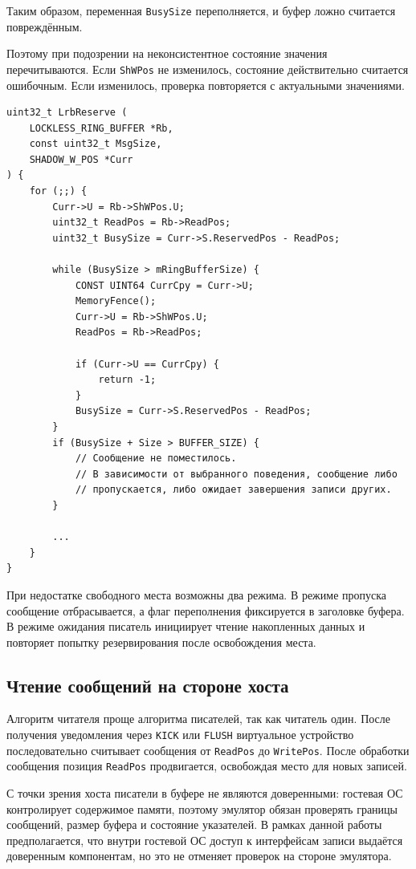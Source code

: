 Таким образом, переменная \texttt{BusySize} переполняется, и буфер ложно
считается повреждённым.

Поэтому при подозрении на неконсистентное состояние значения перечитываются.
Если \texttt{ShWPos} не изменилось, состояние действительно считается ошибочным.
Если изменилось, проверка повторяется с актуальными значениями.

\begin{lstlisting}
uint32_t LrbReserve (
    LOCKLESS_RING_BUFFER *Rb,
    const uint32_t MsgSize,
    SHADOW_W_POS *Curr
) {
    for (;;) {
        Curr->U = Rb->ShWPos.U;
        uint32_t ReadPos = Rb->ReadPos;
        uint32_t BusySize = Curr->S.ReservedPos - ReadPos;

        while (BusySize > mRingBufferSize) {
            CONST UINT64 CurrCpy = Curr->U;
            MemoryFence();
            Curr->U = Rb->ShWPos.U;
            ReadPos = Rb->ReadPos;

            if (Curr->U == CurrCpy) {
                return -1;
            }            
            BusySize = Curr->S.ReservedPos - ReadPos;
        }
        if (BusySize + Size > BUFFER_SIZE) {
            // Сообщение не поместилось.
            // В зависимости от выбранного поведения, сообщение либо
            // пропускается, либо ожидает завершения записи других.
        }

        ...
    }
}
\end{lstlisting}

При недостатке свободного места возможны два режима. В режиме пропуска сообщение
отбрасывается, а флаг переполнения фиксируется в заголовке буфера. В режиме
ожидания писатель инициирует чтение накопленных данных и повторяет попытку
резервирования после освобождения места.

\subsection{Чтение сообщений на стороне хоста}
\label{sec:ch2-reader}

Алгоритм читателя проще алгоритма писателей, так как читатель один. После
получения уведомления через \texttt{KICK} или \texttt{FLUSH} виртуальное
устройство последовательно считывает сообщения от \texttt{ReadPos} до
\texttt{WritePos}. После обработки сообщения позиция \texttt{ReadPos}
продвигается, освобождая место для новых записей.

С точки зрения хоста писатели в буфере не являются доверенными: гостевая ОС
контролирует содержимое памяти, поэтому эмулятор обязан проверять границы
сообщений, размер буфера и состояние указателей. В рамках данной работы
предполагается, что внутри гостевой ОС доступ к интерфейсам записи выдаётся
доверенным компонентам, но это не отменяет проверок на стороне эмулятора.
